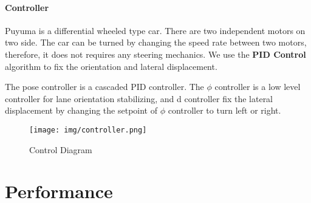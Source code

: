 \begin{spacing}{2.0}
\subsubsection{Controller}

Puyuma is a differential wheeled type car. There are two independent motors on two side. The car can be turned by changing the speed rate between two motors, therefore, it does not requires any steering mechanics. We use the \textbf{PID Control} algorithm to fix the orientation and lateral displacement.

The pose controller is a cascaded PID controller. The $\phi$ controller is a low level controller for lane orientation stabilizing, and d controller fix the lateral displacement by changing the setpoint of $\phi$ controller to turn left or right.

\begin{figure}	
	\centering
	\texttt{[image: img/controller.png]}
	\caption{Control Diagram}
	\label{fig:controller}
\end{figure}

\end{spacing}
\clearpage
{}

\newpage
{}
\chapter{Performance}
\pagestyle{plain}

